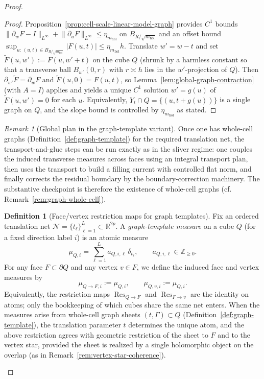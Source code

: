 \documentclass[11pt]{article}
\numberwithin{equation}{section}  %
\theoremstyle{plain}
\theoremstyle{definition}
\newtheorem{definition}[theorem]{Definition}
\theoremstyle{remark}
\newtheorem{remark}[theorem]{Remark}
\newcommand{\R}{\mathbb{R}}
\newcommand{\Z}{\mathbb{Z}}
\newcommand{\mhol}{m_{\mathrm{hol}}} %
\begin{document}
\begin{proof}
\begin{proof}
Proposition~\ref{prop:cell-scale-linear-model-graph} provides $C^1$ bounds
$\|\partial_w F-I\|_{L^\infty}\!+\!\|\partial_u F\|_{L^\infty}\le \eta_{\mhol}$ on $B_{R/\sqrt{\mhol}}$
and an offset bound $\sup_{u:\,(u,t)\in B_{R/\sqrt{\mhol}}}|F(u,t)|\le \eta_{\mhol}h$.
Translate $w'=w-t$ and set $\widetilde F(u,w'):=F(u,w'+t)$ on the cube $Q$ (shrunk by a harmless constant so that a transverse ball
$B_{w'}(0,r)$ with $r\asymp h$ lies in the $w'$-projection of $Q$).
Then $\partial_{w'}\widetilde F=\partial_wF$ and $\widetilde F(u,0)=F(u,t)$, so Lemma~\ref{lem:global-graph-contraction}
(with $A=I$) applies and yields a unique $C^1$ solution $w'=g(u)$ of $\widetilde F(u,w')=0$ for each $u$.
Equivalently, $Y_t\cap Q=\{(u,t+g(u))\}$ is a single graph on $Q$, and the slope bound is controlled by $\eta_{\mhol}$ as stated.
\end{proof}

%
\begin{remark}[Global plan in the graph-template variant]\label{rem:global-graph-plan}
Once one has whole-cell graphs (Definition~\ref{def:graph-template}) for the required translation net, the transport-and-glue steps can be
run exactly as in the sliver regime: one couples the induced transverse measures across faces using an integral transport plan, then uses
the transport to build a filling current with controlled flat norm, and finally corrects the residual boundary by the boundary-correction
machinery.
The substantive checkpoint is therefore the existence of whole-cell graphs (cf. Remark~\ref{rem:graph-whole-cell}).
\end{remark}


%
\begin{definition}[Face/vertex restriction maps for graph templates]\label{def:graph-restriction-maps}
Fix an ordered translation net $\mathcal N=\{t_\ell\}_{\ell=1}^L\subset \R^{2p}$.
A \emph{graph-template measure} on a cube $Q$ (for a fixed direction label $i$) is an atomic measure
\[
\mu_{Q,i}=\sum_{\ell=1}^L a_{Q,i,\ell}\,\delta_{t_\ell},
\qquad a_{Q,i,\ell}\in\Z_{\ge 0}.
\]
For any face $F\subset\partial Q$ and any vertex $v\in F$, we define the induced face and vertex measures by
\[
\mu_{Q\to F,i}:=\mu_{Q,i},
\qquad
\mu_{Q,v,i}:=\mu_{Q,i}.
\]
Equivalently, the restriction maps $\operatorname{Res}_{Q\to F}$ and $\operatorname{Res}_{F\to v}$ are the identity on atoms; only the bookkeeping
of which cubes share the same net enters.
When the measures arise from whole-cell graph sheets $(t,\Gamma)\subset Q$ (Definition~\ref{def:graph-template}),
the translation parameter $t$ determines the unique atom, and the above restriction agrees with geometric restriction of the
sheet to $F$ and to the vertex star, provided the sheet is realized by a single holomorphic object on the overlap
(as in Remark~\ref{rem:vertex-star-coherence}).
\end{definition}




\end{proof}
\end{document}
